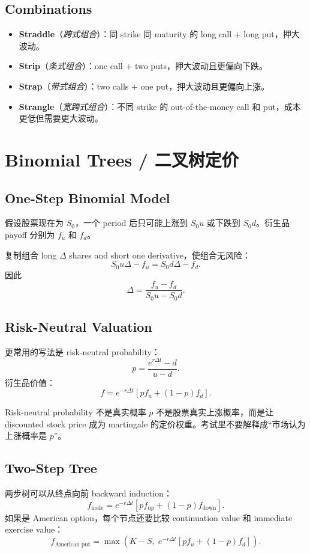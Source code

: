 \documentclass[11pt,a4paper,openany]{ctexbook}
\newcommand{\term}[2]{\textbf{#1}（\emph{#2}）}
\newcommand{\source}[1]{\par\smallskip\noindent{\small\textcolor{muted}{Source: #1}}\par}
\begin{document}
\section{Combinations}
\begin{itemize}
  \item \term{Straddle}{跨式组合}：同 strike 同 maturity 的 long call + long put，押大波动。
  \item \term{Strip}{条式组合}：one call + two puts，押大波动且更偏向下跌。
  \item \term{Strap}{带式组合}：two calls + one put，押大波动且更偏向上涨。
  \item \term{Strangle}{宽跨式组合}：不同 strike 的 out-of-the-money call 和 put，成本更低但需要更大波动。
\end{itemize}

\chapter{Binomial Trees / 二叉树定价}
\source{Lecture 12; Assignment 4}

\section{One-Step Binomial Model}
假设股票现在为 $S_0$，一个 period 后只可能上涨到 $S_0u$ 或下跌到 $S_0d$。衍生品 payoff 分别为 $f_u$ 和 $f_d$。

复制组合 long $\Delta$ shares and short one derivative，使组合无风险：
\[
S_0u\Delta-f_u=S_0d\Delta-f_d.
\]
因此
\[
\Delta=\frac{f_u-f_d}{S_0u-S_0d}.
\]

\section{Risk-Neutral Valuation}
更常用的写法是 risk-neutral probability：
\[
p=\frac{e^{r\Delta t}-d}{u-d}.
\]
衍生品价值：
\[
f=e^{-r\Delta t}\left[pf_u+(1-p)f_d\right].
\]

\begin{warningbox}{Risk-neutral probability 不是真实概率}
$p$ 不是股票真实上涨概率，而是让 discounted stock price 成为 martingale 的定价权重。考试里不要解释成“市场认为上涨概率是 $p$”。
\end{warningbox}

\section{Two-Step Tree}
两步树可以从终点向前 backward induction：
\[
f_{\text{node}}=e^{-r\Delta t}\left[p f_{\text{up}}+(1-p)f_{\text{down}}\right].
\]
如果是 American option，每个节点还要比较 continuation value 和 immediate exercise value：
\[
f_{\text{American put}}=\max\left(K-S,\; e^{-r\Delta t}[pf_u+(1-p)f_d]\right).
\]
\end{document}
